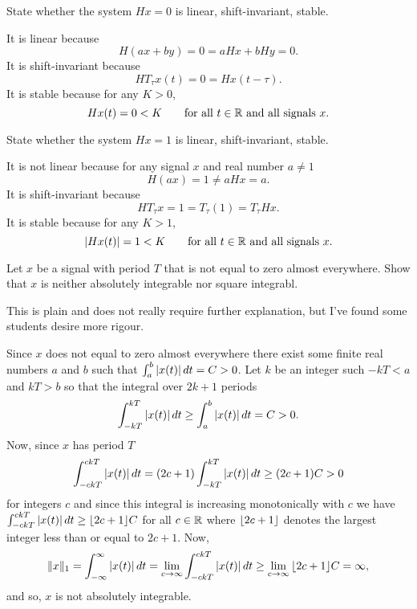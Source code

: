 \begin{excersizelist}
\item State whether the system $H x = 0$ is linear, shift-invariant,  stable.
\begin{solution}
It is linear because
\[
H(ax + by) = 0 = aH x + bH y = 0.
\]
It is shift-invariant because
\[
H T_{\tau} x (t) = 0 = H x(t-\tau).
\]
It is stable because for any $K > 0$,
\[
Hx(t) = 0 < K \qquad \text{for all $t \in {\mathbb R}$ and all signals $x$}. 
\]
\end{solution}

\item State whether the system $Hx = 1$ is linear, shift-invariant,  stable.
\begin{solution}
It is not linear because for any signal $x$ and real number $a \neq 1$
\[
H(ax) = 1 \neq  aHx = a.
\]
It is shift-invariant because
\[
HT_{\tau} x = 1 = T_\tau(1) = T_\tau Hx.
\]
It is  stable because for any $K > 1$, 
\[
\left\vert H x(t) \right\vert = 1 < K \qquad \text{for all $t \in {\mathbb R}$ and all signals $x$}. 
\]
\end{solution}

\item \label{exer:periodnotabsint} Let $x$ be a signal with period $T$ that is not equal to zero almost everywhere.  Show that $x$ is neither absolutely integrable nor square integrabl.
\begin{solution}
This is plain and does not really require further explanation, but I've found some students desire more rigour.  

Since $x$ does not equal to zero almost everywhere there exist some finite real numbers $a$ and $b$  such that $\int_{a}^b \left\vert x(t) \right\vert dt = C > 0$.  Let $k$ be an integer such $-kT < a$ and $kT > b$ so that the integral over $2k+1$ periods 
\[
\int_{-kT}^{kT}\left\vert x(t) \right\vert dt \geq \int_{a}^b \left\vert x(t) \right\vert dt = C > 0.
\] 
Now, since $x$ has period $T$
\[
\int_{-ckT}^{ckT}\left\vert x(t) \right\vert dt = (2c+1) \int_{-kT}^{kT}\left\vert x(t) \right\vert dt \geq (2c+1)C > 0
\] 
for integers $c$ and since this integral is increasing monotonically with $c$ we have $\int_{-ckT}^{ckT}\left\vert x(t) \right\vert dt \geq {\left\lfloor 2c+1 \right\rfloor}C$ for all $c \in {\mathbb R}$ where ${\left\lfloor 2c+1 \right\rfloor}$ denotes the largest integer less than or equal to $2c+1$.  Now,
\[
\|x\|_1 = \int_{-\infty}^{\infty} \left\vert x(t) \right\vert dt = \lim_{c \to \infty} \int_{-ckT}^{ckT}\left\vert x(t) \right\vert dt \geq \lim_{c \to \infty} {\left\lfloor 2c+1 \right\rfloor}C = \infty,
\]
and so, $x$ is not absolutely integrable.

\end{solution}

\end{excersizelist}

